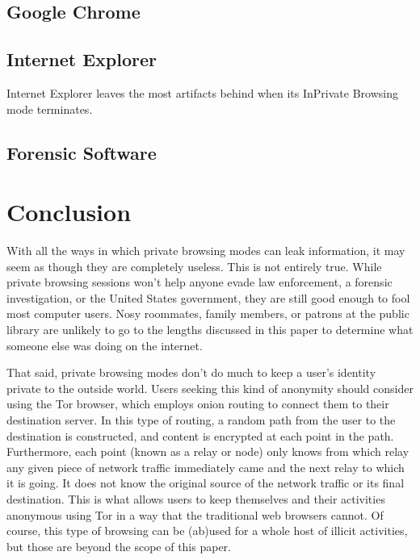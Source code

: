 \documentclass[pdftex,letterpaper,titlepage,12pt]{article}
\begin{document}
    \subsection{Google Chrome}


    \subsection{Internet Explorer}
    Internet Explorer leaves the most artifacts behind when its InPrivate
    Browsing mode terminates.\cite{ohana13} 

    \subsection{Forensic Software}


  \section{Conclusion}
  With all the ways in which private browsing modes can leak information, it
  may seem as though they are completely useless. This is not entirely true.
  While private browsing sessions won't help anyone evade law enforcement, a
  forensic investigation, or the United States government, they are still good
  enough to fool most computer users. Nosy roommates, family members, or
  patrons at the public library are unlikely to go to the lengths discussed in
  this paper to determine what someone else was doing on the internet.

  That said, private browsing modes don't do much to keep a user's identity
  private to the outside world. Users seeking this kind of anonymity should 
  consider using the Tor browser, which employs onion routing to connect them 
  to their destination server. In this type of routing, a random path from the 
  user to the destination is constructed, and content is encrypted at each 
  point in the path. Furthermore, each point (known as a relay or node) only 
  knows from which relay any given piece of network traffic immediately came 
  and the next relay to which it is going. It does not know the original source
  of the network traffic or its final destination. This is what allows users to
  keep themselves and their activities anonymous using Tor in a way that the 
  traditional web browsers cannot.\cite{tor13} Of course, this type of browsing
  can be (ab)used for a whole host of illicit activities, but those are beyond
  the scope of this paper.
\end{document}
